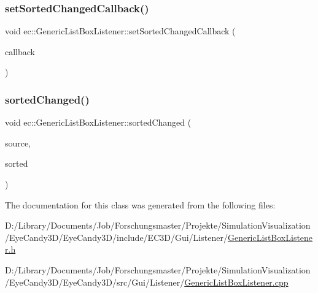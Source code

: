 \mbox{\label{classec_1_1_generic_list_box_listener_adbce2672e6173f9f2b09d6ba9df09828}} 
\subsubsection{\texorpdfstring{set\+Sorted\+Changed\+Callback()}{setSortedChangedCallback()}}
{\footnotesize\ttfamily void ec\+::\+Generic\+List\+Box\+Listener\+::set\+Sorted\+Changed\+Callback (\begin{DoxyParamCaption}\item[{const \mbox{\hyperlink{classec_1_1_generic_list_box_listener_a42ecf66ec6c32bbe9fe0174b2b1a527f}{Sorted\+Changed\+\_\+\+Callback}} \&}]{callback }\end{DoxyParamCaption})}

\mbox{\label{classec_1_1_generic_list_box_listener_a52b32a361ac45c09f0a3ada6e52334d6}} 
\subsubsection{\texorpdfstring{sorted\+Changed()}{sortedChanged()}}
{\footnotesize\ttfamily void ec\+::\+Generic\+List\+Box\+Listener\+::sorted\+Changed (\begin{DoxyParamCaption}\item[{agui\+::\+List\+Box $\ast$}]{source,  }\item[{bool}]{sorted }\end{DoxyParamCaption})\hspace{0.3cm}{\ttfamily [override]}}



The documentation for this class was generated from the following files\+:\begin{DoxyCompactItemize}
\item 
D\+:/\+Library/\+Documents/\+Job/\+Forschungsmaster/\+Projekte/\+Simulation\+Visualization/\+Eye\+Candy3\+D/\+Eye\+Candy3\+D/include/\+E\+C3\+D/\+Gui/\+Listener/\mbox{\hyperlink{_generic_list_box_listener_8h}{Generic\+List\+Box\+Listener.\+h}}\item 
D\+:/\+Library/\+Documents/\+Job/\+Forschungsmaster/\+Projekte/\+Simulation\+Visualization/\+Eye\+Candy3\+D/\+Eye\+Candy3\+D/src/\+Gui/\+Listener/\mbox{\hyperlink{_generic_list_box_listener_8cpp}{Generic\+List\+Box\+Listener.\+cpp}}\end{DoxyCompactItemize}
